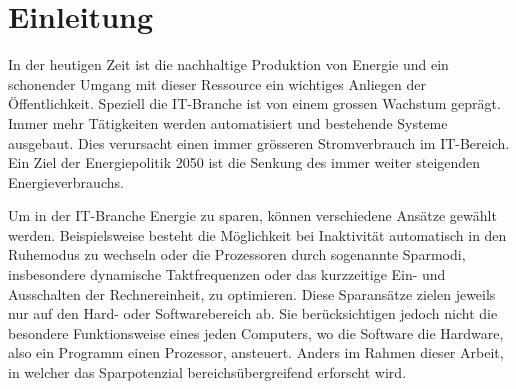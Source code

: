 \chapter{Einleitung}



In der heutigen Zeit ist die nachhaltige Produktion von Energie und ein schonender Umgang mit dieser Ressource ein wichtiges Anliegen der Öffentlichkeit. Speziell die IT-Branche ist von einem grossen Wachstum geprägt. Immer mehr Tätigkeiten werden automatisiert und bestehende Systeme ausgebaut. Dies verursacht einen immer grösseren Stromverbrauch im IT-Bereich. Ein Ziel der Energiepolitik 2050 ist die Senkung des immer weiter steigenden Energieverbrauchs.
\par
Um in der IT-Branche Energie zu sparen, können verschiedene Ansätze gewählt werden. Beispielsweise besteht die Möglichkeit bei Inaktivität automatisch in den Ruhemodus zu wechseln oder die Prozessoren durch sogenannte Sparmodi, insbesondere dynamische Taktfrequenzen oder das kurzzeitige Ein- und Ausschalten der Rechnereinheit, zu optimieren. Diese Sparansätze zielen jeweils nur auf den Hard- oder Softwarebereich ab. Sie berücksichtigen jedoch nicht die besondere Funktionsweise eines jeden Computers, wo die Software die Hardware, also ein Programm einen Prozessor, ansteuert. Anders im Rahmen dieser Arbeit, in welcher das Sparpotenzial bereichsübergreifend erforscht wird.





















